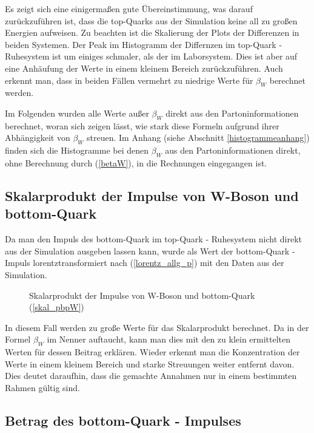 \documentclass[
a4paper,                                %
twoside,                                %
BCOR1.4cm,                      %
ngerman,                                %
10pt,                           %
headings=normal,                %
headsepline,                    %
clearplainpage, %
final,                                  %
div=14,
parskip=full
]{scrbook}
\begin{document}
Es zeigt sich eine einigerma\ss en gute \"Ubereinstimmung, was darauf zur\"uckzuf\"uhren ist, dass die top-Quarks aus der Simulation keine all zu gro\ss en Energien aufweisen. Zu beachten ist die Skalierung der Plots der Differenzen in beiden Systemen. Der Peak im Histogramm der Differnzen im top-Quark - Ruhesystem ist um einiges schmaler, als der im Laborsystem. Dies ist aber auf eine Anh\"aufung der Werte in einem kleinem Bereich zur\"uckzuf\"uhren. Auch erkennt man, dass in beiden F\"allen vermehrt zu niedrige Werte f\"ur $ \beta_{W} $ berechnet werden.

\newpage

Im Folgenden wurden alle Werte au\ss er $ \beta_{W} $ direkt aus den Partoninformationen berechnet, woran sich zeigen l\"asst, wie stark diese Formeln aufgrund ihrer Abh\"angigkeit von $ \beta_{W} $ streuen. Im Anhang (siehe Abschnitt \ref{histogrammeanhang}) finden sich die Histogramme bei denen $ \beta_{W} $ aus den Partoninformationen direkt, ohne Berechnung durch (\ref{betaW}), in die Rechnungen eingegangen ist.

\subsection{Skalarprodukt der Impulse von W-Boson und bottom-Quark}

Da man den Impuls des bottom-Quark im top-Quark - Ruhesystem nicht direkt aus der Simulation ausgeben lassen kann, wurde als Wert der bottom-Quark - Impuls lorentztransformiert nach (\ref{lorentz_allg_p}) mit den Daten aus der Simulation.

\begin{figure}[h]
    \caption{Skalarprodukt der Impulse von W-Boson und bottom-Quark (\ref{skal_pbpW})}
\end{figure}

In diesem Fall werden zu gro\ss e Werte f\"ur das Skalarprodukt berechnet. Da in der Formel $ \beta_{W} $ im Nenner auftaucht, kann man dies mit den zu klein ermittelten Werten f\"ur dessen Beitrag erkl\"aren. Wieder erkennt man die Konzentration der Werte in einem kleinem Bereich und starke Streuungen weiter entfernt davon. Dies deutet daraufhin, dass die gemachte Annahmen nur in einem bestimmten Rahmen g\"ultig sind.

\subsection{Betrag des bottom-Quark - Impulses}
\end{document}
